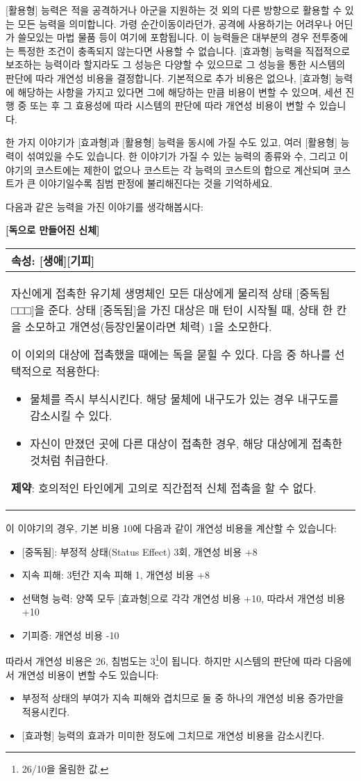 \documentclass[12pt]{report}
\newenvironment{story}[2]
{\begin{center}
		{\large \textbf{[#1]}}\\[1ex]
		\begin{tabular}{|p{\textwidth}|}
			\hline
			\textbf{속성}: #2
			\\
			\hline
		}
		{ 
			\\\hline
		\end{tabular}
	\end{center}
}
\begin{document}
	[활용형] 능력은 적을 공격하거나 아군을 지원하는 것 외의 다른 방향으로 활용할 수 있는 모든 능력을 의미합니다. 가령 순간이동이라던가, 공격에 사용하기는 어려우나 어딘가 쓸모있는 마법 물품 등이 여기에 포함됩니다. 이 능력들은 대부분의 경우 전투중에는 특정한 조건이 충족되지 않는다면 사용할 수 없습니다. [효과형] 능력을 직접적으로 보조하는 능력이라 할지라도 그 성능은 다양할 수 있으므로 그 성능을 통한 시스템의 판단에 따라 개연성 비용을 결정합니다. 기본적으로 추가 비용은 없으나, [효과형] 능력에 해당하는 사항을 가지고 있다면 그에 해당하는 만큼 비용이 변할 수 있으며, 세션 진행 중 또는 후 그 효용성에 따라 시스템의 판단에 따라 개연성 비용이 변할 수 있습니다.
	
	한 가지 이야기가 [효과형]과 [활용형] 능력을 동시에 가질 수도 있고, 여러 [활용형] 능력이 섞여있을 수도 있습니다. 한 이야기가 가질 수 있는 능력의 종류와 수, 그리고 이야기의 코스트에는 제한이 없으나 코스트는 각 능력의 코스트의 합으로 계산되며 코스트가 큰 이야기일수록 침범 판정에 불리해진다는 것을 기억하세요.
	
	\bigskip
	
	다음과 같은 능력을 가진 이야기를 생각해봅시다:
	\begin{story}{독으로 만들어진 신체}{[생애][기피]}
		자신에게 접촉한 유기체 생명체인 모든 대상에게 물리적 상태 [중독됨 □□□]을 준다. 상태 [중독됨]을 가진 대상은 매 턴이 시작될 때, 상태 한 칸을 소모하고 개연성(등장인물이라면 체력) 1을 소모한다.
		
		이 이외의 대상에 접촉했을 때에는 독을 묻힐 수 있다. 다음 중 하나를 선택적으로 적용한다:
		\begin{itemize}
			\item 물체를 즉시 부식시킨다. 해당 물체에 내구도가 있는 경우 내구도를 감소시킬 수 있다.
			\item 자신이 만졌던 곳에 다른 대상이 접촉한 경우, 해당 대상에게 접촉한 것처럼 취급한다.
		\end{itemize}
		
		\textbf{제약}: 호의적인 타인에게 고의로 직간접적 신체 접촉을 할 수 없다.
	\end{story}
	이 이야기의 경우, 기본 비용 10에 다음과 같이 개연성 비용을 계산할 수 있습니다:
	\begin{itemize}
		\item {}[중독됨]: 부정적 상태(Status Effect) 3회, 개연성 비용 +8
		\item 지속 피해: 3턴간 지속 피해 1, 개연성 비용 +8
		\item 선택형 능력: 양쪽 모두 [효과형]으로 각각 개연성 비용 +10, 따라서 개연성 비용 +10
		\item 기피증: 개연성 비용 -10
	\end{itemize}
	따라서 개연성 비용은 26, 침범도는 3\footnote{26/10을 올림한 값.}이 됩니다. 하지만 시스템의 판단에 따라 다음에서 개연성 비용이 변할 수도 있습니다:
	\begin{itemize}
		\item 부정적 상태의 부여가 지속 피해와 겹치므로 둘 중 하나의 개연성 비용 증가만을 적용시킨다.
		\item {}[효과형] 능력의 효과가 미미한 정도에 그치므로 개연성 비용을 감소시킨다.
	\end{itemize}
	
\end{document}
